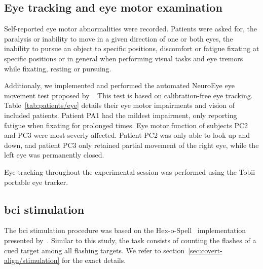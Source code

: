 \subsection{Eye tracking and eye motor examination}

Self-reported eye motor abnormalities were recorded.
Patients were asked for, the paralysis or inability to move in a given
direction of one or both eyes, the inability to pursue an object to specific
positions, discomfort or fatigue fixating at specific positions or in general
when performing visual tasks and eye tremors while fixating, resting or
pursuing.

Additionaly, we implemented and performed the automated NeuroEye eye movement
test proposed by~\textcite{Hassan2022}.
This test is based on calibration-free eye tracking.
Table~\ref{tab:patients/eye} details their eye motor impairments and vision of
included patients.
Patient PA1 had the mildest impairment, only reporting fatigue when fixating
for prolonged times.
Eye motor function of subjects PC2 and PC3 were most severly affected.
Patient PC2 was only able to look up and down, and patient PC3 only retained
partial movement of the right eye, while the left eye was permanently closed.

\begin{table}[t]
  \centering
  \footnotesize
  
  \caption[Vision and eye motor impairment for included patients.]{%
  Vision and eye motor impairment for included patients.
  Eye motor impairment was assessed with a combination of self-reported issues
  by the subject and the NeuroEye~\cite{Hassan2022} test.
  LogMAR: lower is better.}
  \label{tab:patients/eye}
\end{table}

Eye tracking throughout the experimental session was performed using the Tobii~
portable eye tracker.

\subsection{\Ac{bci} stimulation}

The \ac{bci} stimulation procedure was based on the
Hex-o-Spell~\cite{Treder2010} implementation presented
by~\textcite{VanDenKerchove2024}.
Similar to this study, the task consists of counting the flashes of a cued
target among all flashing targets.
We refer to section~\ref{sec:covert-align/stimulation} for the exact details.

